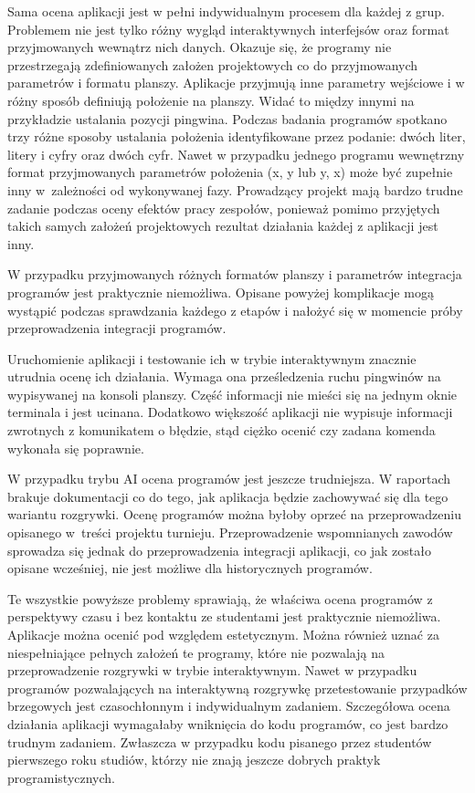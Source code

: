 Sama ocena aplikacji jest w pełni indywidualnym procesem dla każdej z grup.
Problemem nie jest tylko różny wygląd interaktywnych interfejsów oraz format przyjmowanych wewnątrz nich danych.
Okazuje się, że programy nie przestrzegają zdefiniowanych założen projektowych co do przyjmowanych parametrów i formatu planszy.
Aplikacje przyjmują inne parametry wejściowe i w różny sposób definiują położenie na planszy.
Widać to między innymi na przykładzie ustalania pozycji pingwina.
Podczas badania programów spotkano trzy różne sposoby ustalania położenia identyfikowane przez podanie: dwóch liter, litery i cyfry oraz dwóch cyfr.
Nawet w przypadku jednego programu wewnętrzny format przyjmowanych parametrów położenia (x, y lub y, x) może być zupełnie inny w~zależności od wykonywanej fazy.
Prowadzący projekt mają bardzo trudne zadanie podczas oceny efektów pracy zespołów, ponieważ pomimo przyjętych takich samych założeń projektowych rezultat działania każdej z aplikacji jest inny.

W przypadku przyjmowanych różnych formatów planszy i parametrów integracja programów jest praktycznie niemożliwa.
Opisane powyżej komplikacje mogą wystąpić podczas sprawdzania każdego z etapów i nałożyć się w momencie próby przeprowadzenia integracji programów.

Uruchomienie aplikacji i testowanie ich w trybie interaktywnym znacznie utrudnia ocenę ich działania.
Wymaga ona prześledzenia ruchu pingwinów na wypisywanej na konsoli planszy.
Część informacji nie mieści się na jednym oknie terminala i jest ucinana.
Dodatkowo większość aplikacji nie wypisuje informacji zwrotnych z komunikatem o błędzie, stąd ciężko ocenić czy zadana komenda wykonała się poprawnie.

W przypadku trybu AI ocena programów jest jeszcze trudniejsza.
W raportach brakuje dokumentacji co do tego, jak aplikacja będzie zachowywać się dla tego wariantu rozgrywki.
Ocenę programów można byłoby oprzeć na przeprowadzeniu opisanego w~treści projektu turnieju.
Przeprowadzenie wspomnianych zawodów sprowadza się jednak do przeprowadzenia integracji aplikacji, co jak zostało opisane wcześniej, nie jest możliwe dla historycznych programów.

Te wszystkie powyższe problemy sprawiają, że właściwa ocena programów z perspektywy czasu i bez kontaktu ze studentami jest praktycznie niemożliwa.
Aplikacje można ocenić pod względem estetycznym.
Można również uznać za niespełniające pełnych założeń te programy, które nie pozwalają na przeprowadzenie rozgrywki w trybie interaktywnym.
Nawet w przypadku programów pozwalających na interaktywną rozgrywkę przetestowanie przypadków brzegowych jest czasochłonnym i indywidualnym zadaniem.
Szczegółowa ocena działania aplikacji wymagałaby wniknięcia do kodu programów, co jest bardzo trudnym zadaniem.
Zwłaszcza w przypadku kodu pisanego przez studentów pierwszego roku studiów, którzy nie znają jeszcze dobrych praktyk programistycznych.

